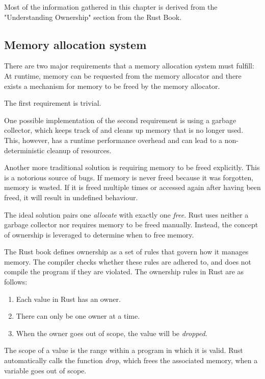 \documentclass[sigplan,11pt,nonacm]{acmart}
\begin{document}
Most of the information gathered in this chapter is derived from the "Understanding Ownership" section from the Rust Book\cite{rust-book}.


\subsection{Memory allocation system}

There are two major requirements that a memory allocation system must fulfill:
At runtime, memory can be requested from the memory allocator and there exists a mechanism for memory to be freed by the memory allocator.

The first requirement is trivial.

One possible implementation of the second requirement is using a garbage collector, which keeps track of and cleans up memory that is no longer used.
This, however, has a runtime performance overhead and can lead to a non-deterministic cleanup of resources.

Another more traditional solution is requiring memory to be freed explicitly.
This is a notorious source of bugs.
If memory is never freed because it was forgotten, memory is wasted.
If it is freed multiple times or accessed again after having been freed, it will result in undefined behaviour.

The ideal solution pairs one \emph{allocate} with exactly one \emph{free}.
Rust uses neither a garbage collector nor requires memory to be freed manually.
Instead, the concept of ownership is leveraged to determine when to free memory.

The Rust book \cite{rust-book} defines ownership as a set of rules that govern how it manages memory.
The compiler checks whether these rules are adhered to, and does not compile the program if they are violated.
The ownership rules in Rust are as follows:
\begin{enumerate}
  \item Each value in Rust has an owner.
  \item There can only be one owner at a time.
  \item When the owner goes out of scope, the value will be \emph{dropped}.
\end{enumerate}
The scope of a value is the range within a program in which it is valid.
Rust automatically calls the function \emph{drop}, which frees the associated memory, when a variable goes out of scope.
\end{document}
